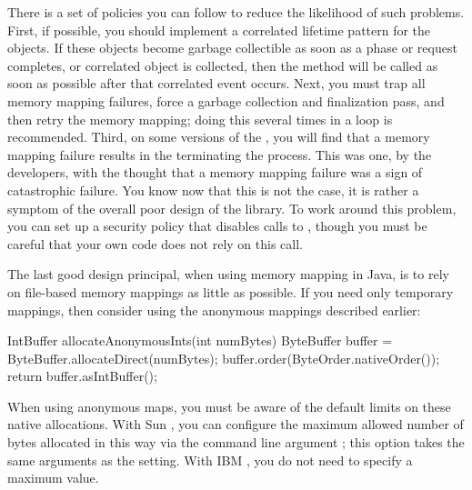 There is a set of policies you can follow to reduce the likelihood of such
problems. First, if possible, you should implement a correlated lifetime pattern
for the  objects. If these objects become garbage collectible
as soon as a phase or request completes, or correlated object is collected, then
the  method will be called as soon as possible after
that correlated event occurs. Next, you must trap all memory mapping failures,
force a garbage collection and finalization pass, and then retry the memory
mapping; doing this several times in a loop is recommended. Third, on some
versions of the \jre, you will find that a memory mapping failure results in the
\jre terminating the process. This was one, by the \jre developers, with the
thought that a memory mapping failure was a sign of catastrophic failure. You
know now that this is not the case, it is rather a symptom of the overall poor
design of the  library. To work around this problem, you can set
up a security policy that disables calls to , though you must
be careful that your own code does not rely on this call.

The last good design principal, when using memory mapping in Java, is to rely on
file-based memory mappings as little as possible. If you need only temporary
mappings, then consider using the anonymous mappings described earlier:
\begin{shortlisting}
IntBuffer allocateAnonymousInts(int numBytes) {
   ByteBuffer buffer = ByteBuffer.allocateDirect(numBytes);
   buffer.order(ByteOrder.nativeOrder());
   return buffer.asIntBuffer();
}
\end{shortlisting}
When using anonymous maps, you must be aware of the default limits on these
native allocations. With Sun \jres, you can configure the maximum allowed number
of bytes allocated in this way via the command line argument
; this option takes the same arguments as the
 setting. With IBM \jres, you do not need to specify a maximum value.

